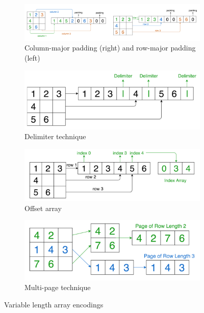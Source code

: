 \documentclass[conference]{IEEEtran}
\begin{document}
\begin{figure}
\centering
\begin{subfigure}[b]{0.3\textwidth}
\includegraphics[scale=0.6]{padding.png}
\caption{Column-major padding (right) and row-major padding (left)}
\end{subfigure}
\begin{subfigure}[b]{0.3\textwidth}
\includegraphics[scale=0.5]{delimiter.png}
\caption{Delimiter technique}
\end{subfigure}
\begin{subfigure}[b]{0.3\textwidth}
\includegraphics[scale=0.5]{offset.png}
\caption{Offset array}
\end{subfigure}
\begin{subfigure}[b]{0.3\textwidth}
\includegraphics[scale=0.5]{multipage.png}
\caption{Multi-page technique}
\end{subfigure}
\caption{Variable length array encodings}
\end{figure}
\end{document}
